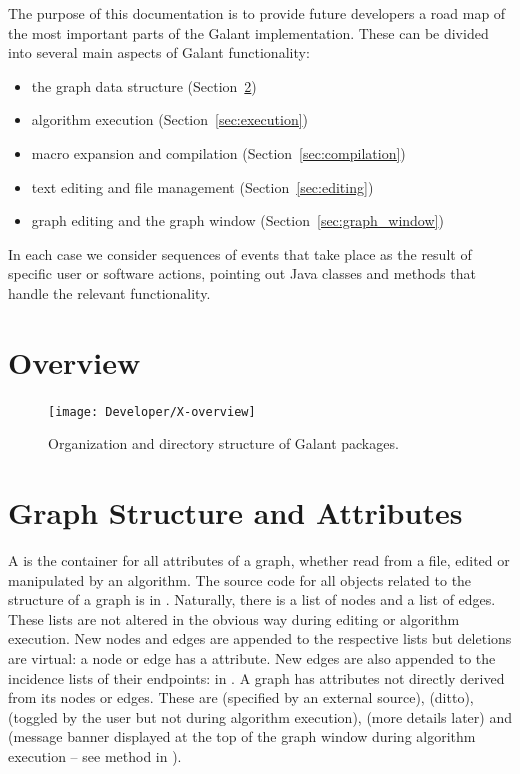 The purpose of this documentation is to provide future developers a
road map of the most important parts of the Galant implementation. These can
be divided into several main aspects of Galant functionality:
\begin{itemize}
\item the graph data structure (Section~\ref{sec:graph_structure})
\item algorithm execution (Section~\ref{sec:execution})
\item macro expansion and compilation (Section~\ref{sec:compilation})
\item text editing and file management (Section~\ref{sec:editing})
\item graph editing and the graph window (Section~\ref{sec:graph_window})
\end{itemize}
In each case we consider sequences of events that take place as the result of
specific user or software actions, pointing out Java classes and methods that
handle the relevant functionality.

\section{Overview}

\begin{figure}
  \texttt{[image: Developer/X-overview]}

  \medskip
  \caption{Organization and directory structure of Galant packages.}
  \label{fig:overview}
\end{figure}



\section{Graph Structure and Attributes} \label{sec:graph_structure}

A  is the container for all attributes of a graph, whether read
from a file, edited or manipulated by an algorithm.
The source code for all objects related to the structure of a graph is in
.
Naturally, there is a list of nodes and a list of edges.
These lists are not altered in the obvious way during editing or algorithm
execution. New nodes and edges are appended to the respective lists but
deletions are virtual: a node or edge has a  attribute.
New edges are also appended to the incidence lists of their endpoints:
 in .
A graph has attributes not directly derived from its nodes or edges. These
are  (specified by an external source),  (ditto),
 (toggled by the user but not during algorithm execution),
 (more details later) and  (message banner
displayed at the top of the graph window during algorithm execution -- see
method  in ).

